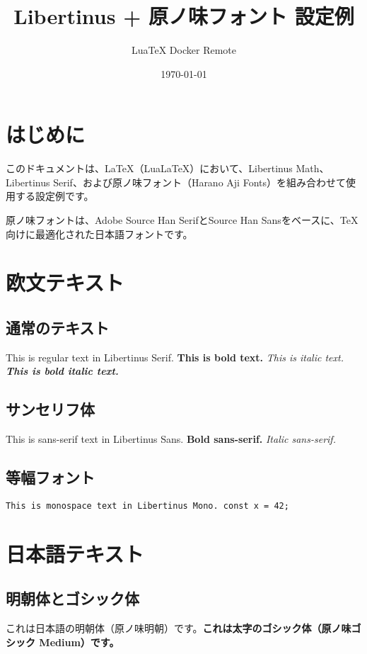 \documentclass[a4paper,12pt]{ltjsarticle}
\title{Libertinus + 原ノ味フォント 設定例}
\author{LuaTeX Docker Remote}
\date{\today}
\begin{document}
\maketitle

\section{はじめに}

このドキュメントは、\LaTeX{}（Lua\LaTeX{}）において、Libertinus Math、Libertinus Serif、および原ノ味フォント（Harano Aji Fonts）を組み合わせて使用する設定例です。

原ノ味フォントは、Adobe Source Han SerifとSource Han Sansをベースに、\TeX{}向けに最適化された日本語フォントです。

\section{欧文テキスト}

\subsection{通常のテキスト}

This is regular text in Libertinus Serif. \textbf{This is bold text.} \textit{This is italic text.} \textbf{\textit{This is bold italic text.}}

\subsection{サンセリフ体}

\textsf{This is sans-serif text in Libertinus Sans. \textbf{Bold sans-serif.} \textit{Italic sans-serif.}}

\subsection{等幅フォント}

\texttt{This is monospace text in Libertinus Mono. const x = 42;}

\section{日本語テキスト}

\subsection{明朝体とゴシック体}

これは日本語の明朝体（原ノ味明朝）です。\textbf{これは太字のゴシック体（原ノ味ゴシック Medium）です。}
\end{document}
